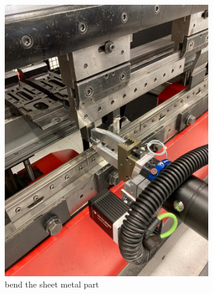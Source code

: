 \begin{figure}[h]
\begin{subfigure}[b]{0.32\textwidth}
        \includegraphics[width=\textwidth]{figures/bending/bending4-002.png}
        \caption{bend the sheet metal part}
        \label{subfig:bending4}
    \end{subfigure}\hspace{0.1cm}
    \begin{subfigure}[b]{0.32\textwidth}
        \centering

\end{subfigure}
\end{figure}
